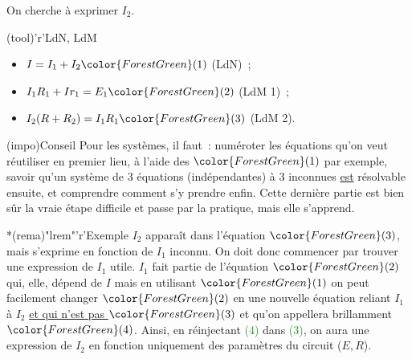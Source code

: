 \documentclass[../../main/main.tex]{subfiles}
\begin{document}
{\begin{tcbraster}[raster columns=5, raster equal height=rows]
\begin{tcolorbox}[blankest, raster multicolumn=2, space to=\myspace]
\begin{tcbraster}[raster columns=1]
\begin{tcb}[add to natural height=\myspace]
                On cherche à exprimer $I_2$.
            \end{tcb}
            \begin{tcb}(tool)'r'{{LdN, LdM}}
                \begin{itemize}
                    \item $I = I_1 + I_2 \color{ForestGreen}(1)$ (LdN)~;
                    \item $I_1R_1 + Ir_1 = E_1 \color{ForestGreen}(2)$ (LdM 1)~;
                    \item $I_2(R+R_2) = I_1R_1 \color{ForestGreen}(3)$ (LdM 2).
                \end{itemize}
            \end{tcb}
        \end{tcbraster}
    \end{tcolorbox}
\end{tcbraster}
\begin{tcbraster}[raster columns=2, raster equal height=rows]
    \begin{tcb}(impo){Conseil}
        Pour les systèmes, il faut~: numéroter les équations qu'on veut
        réutiliser en premier lieu, à l'aide des $\color{ForestGreen}(1)$ par
        exemple, savoir qu'un système de 3 équations (indépendantes) à 3
        inconnues \underline{est} résolvable ensuite, et comprendre comment s'y
        prendre enfin. Cette dernière partie est bien sûr la vraie étape
        difficile et passe par la pratique, mais elle s'apprend.
    \end{tcb}
    \begin{tcb}*(rema)"lrem"'r'{Exemple}
        $I_2$ apparaît dans l'équation $\color{ForestGreen}(3)$, mais s'exprime
        en fonction de $I_1$ inconnu. On doit donc commencer par trouver une
        expression de $I_1$ utile. $I_1$ fait partie de l'équation
        $\color{ForestGreen}(2)$ qui, elle, dépend de $I$ mais en utilisant
        $\color{ForestGreen}(1)$ on peut facilement changer
        $\color{ForestGreen}(2)$ en une nouvelle équation reliant $I_1$ à $I_2$
        \underline{et qui n'est pas $\color{ForestGreen}(3)$} et qu'on
        appellera brillamment $\color{ForestGreen}(4)$. Ainsi, en réinjectant
        \textcolor{ForestGreen}{(4)} dans \textcolor{ForestGreen}{(3)}, on aura
        une expression de $I_2$ en fonction uniquement des paramètres du circuit
        ($E, R$).
    \end{tcb}
\end{tcbraster}

}
\end{document}
